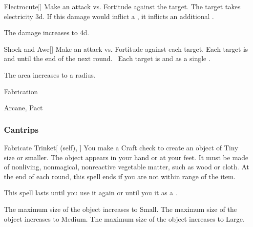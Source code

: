 \lowercase{\hypertarget{spell:Electrocute}{}}\label{spell:Electrocute}
\begin{freeability}[Rank 5]{\hypertarget{spell:Electrocute}{Electrocute}}[]
Make an attack vs. Fortitude against the target.
\hit The target takes electricity  \plus3d.
If this damage would inflict a , it inflicts an additional .

\rankline
{} The damage increases to  \plus4d.

\end{freeability}
\vspace{0.25em}



\lowercase{\hypertarget{spell:Shock and Awe}{}}\label{spell:Shock and Awe}
\begin{freeability}[Rank 5]{\hypertarget{spell:Shock and Awe}{Shock and Awe}}[]
Make an attack vs. Fortitude against each target.
\hit Each target is  and  until the end of the next round.
\ Each target is  and  as a single .

\rankline
{} The area increases to a \arealarge radius.

\end{freeability}
\vspace{0.25em}


\newpage
\begin{spellsection}{Fabrication}

\begin{spellheader}
\end{spellheader}


 Arcane, Pact

\subsubsection{Cantrips}


\begin{attuneability}{Fabricate Trinket}[ (self), ]
You make a Craft check to create an object of Tiny size or smaller.
The object appears in your hand or at your feet.
It must be made of nonliving, nonmagical, nonreactive vegetable matter, such as wood or cloth.
At the end of each round, this spell ends if you are not within \rngmed range of the item.

This spell lasts until you use it again or until you  it as a .

\rankline
{} The maximum size of the object increases to Small.
 The maximum size of the object increases to Medium.
 The maximum size of the object increases to Large.
\end{attuneability}

\end{spellsection}


